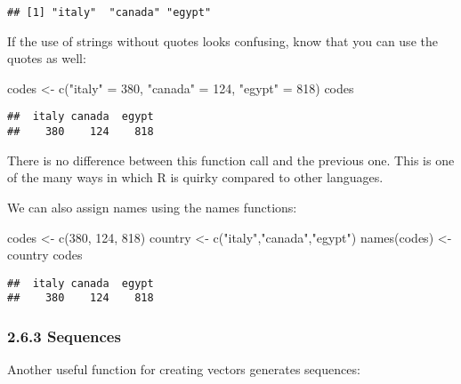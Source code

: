 \documentclass[
]{article}
\newenvironment{Shaded}{\begin{snugshade}}{\end{snugshade}}
\newcommand{\DecValTok}[1]{\textcolor[rgb]{0.00,0.00,0.81}{#1}}
\newcommand{\FunctionTok}[1]{\textcolor[rgb]{0.00,0.00,0.00}{#1}}
\newcommand{\NormalTok}[1]{#1}
\newcommand{\OtherTok}[1]{\textcolor[rgb]{0.56,0.35,0.01}{#1}}
\newcommand{\StringTok}[1]{\textcolor[rgb]{0.31,0.60,0.02}{#1}}
\begin{document}
\begin{verbatim}
## [1] "italy"  "canada" "egypt"
\end{verbatim}

If the use of strings without quotes looks confusing, know that you can
use the quotes as well:

\begin{Shaded}
\begin{Highlighting}[]
\NormalTok{codes }\OtherTok{\textless{}{-}} \FunctionTok{c}\NormalTok{(}\StringTok{"italy"} \OtherTok{=} \DecValTok{380}\NormalTok{, }\StringTok{"canada"} \OtherTok{=} \DecValTok{124}\NormalTok{, }\StringTok{"egypt"} \OtherTok{=} \DecValTok{818}\NormalTok{)}
\NormalTok{codes}
\end{Highlighting}
\end{Shaded}

\begin{verbatim}
##  italy canada  egypt 
##    380    124    818
\end{verbatim}

There is no difference between this function call and the previous one.
This is one of the many ways in which R is quirky compared to other
languages.

We can also assign names using the names functions:

\begin{Shaded}
\begin{Highlighting}[]
\NormalTok{codes }\OtherTok{\textless{}{-}} \FunctionTok{c}\NormalTok{(}\DecValTok{380}\NormalTok{, }\DecValTok{124}\NormalTok{, }\DecValTok{818}\NormalTok{)}
\NormalTok{country }\OtherTok{\textless{}{-}} \FunctionTok{c}\NormalTok{(}\StringTok{"italy"}\NormalTok{,}\StringTok{"canada"}\NormalTok{,}\StringTok{"egypt"}\NormalTok{)}
\FunctionTok{names}\NormalTok{(codes) }\OtherTok{\textless{}{-}}\NormalTok{ country}
\NormalTok{codes}
\end{Highlighting}
\end{Shaded}

\begin{verbatim}
##  italy canada  egypt 
##    380    124    818
\end{verbatim}

\hypertarget{sequences}{%
\subsubsection{2.6.3 Sequences}\label{sequences}}

Another useful function for creating vectors generates sequences:
\end{document}

